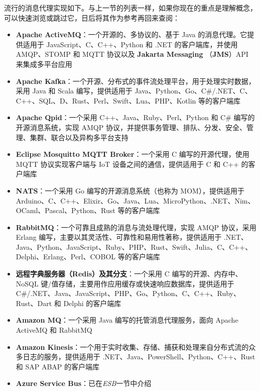 \label{idx:1352}
\label{idx:1353}
流行的消息代理实现如下。与上一节的列表一样，如果你现在的重点是理解概念，可以快速浏览或跳过它，日后将其作为参考再回来查阅：

\begin{itemize}
\label{idx:1354}
\label{idx:1355}
\item \textbf{Apache ActiveMQ}：一个开源的、多协议的、基于 Java 的消息代理。它提供适用于 JavaScript、C、C++、Python 和 .NET 的客户端库，并使用 AMQP、STOMP 和 MQTT 协议以及 \textbf{Jakarta Messaging }（\textbf{JMS}）API 来集成多平台应用
\label{idx:1356}
\item \textbf{Apache Kafka}：一个开源、分布式的事件流处理平台，用于处理实时数据，采用 Java 和 Scala 编写，提供适用于 Java、Python、Go、C\#/.NET、C、C++、SQL、D、Rust、Perl、Swift、Lua、PHP、Kotlin 等的客户端库
\label{idx:1357}
\item \textbf{Apache Qpid}：一个采用 C++、Java、Ruby、Perl、Python 和 C\# 编写的开源消息系统，实现 AMQP 协议，并提供事务管理、排队、分发、安全、管理、集群、联合以及异构多平台支持
\label{idx:1358}
\item \textbf{Eclipse Mosquitto MQTT Broker}：一个采用 C 编写的开源代理，使用 MQTT 协议实现客户端与 IoT 设备之间的通信，提供适用于 C 和 C++ 的客户端库
\label{idx:1359}
\item \textbf{NATS}：一个采用 Go 编写的开源消息系统（也称为 MOM），提供适用于 Arduino、C、C++、Elixir、Go、Java、Lua、MicroPython、.NET、Nim、OCaml、Pascal、Python、Rust 等的客户端库
\label{idx:1360}
\item \textbf{RabbitMQ}：一个可靠且成熟的消息与流处理代理，实现 AMQP 协议，采用 Erlang 编写，主要以其灵活性、可靠性和易用性著称，提供适用于 .NET、Java、Python、JavaScript、Ruby、PHP、Rust、Swift、Julia、C、C++、Delphi、Erlang、Perl、COBOL 等的客户端库
\label{idx:1361}
\item \textbf{远程字典服务器（Redis）及其分支}：一个采用 C 编写的开源、内存中、NoSQL 键/值存储，主要用作应用缓存或快速响应数据库，提供适用于 C\#/.NET、Java、JavaScript、PHP、Go、Python、C、C++、Ruby、Rust、Dart 和 Delphi 的客户端库
\label{idx:1362}
\item \textbf{Amazon MQ}：一个采用 Java 编写的托管消息代理服务，面向 Apache ActiveMQ 和 RabbitMQ
\label{idx:1363}
\item \textbf{Amazon Kinesis}：一个用于实时收集、存储、捕获和处理来自分布式流的众多日志的服务，提供适用于 .NET、Java、PowerShell、Python、C++、Rust 和 SAP ABAP 的客户端库
\label{idx:1364}
\item \textbf{Azure Service Bus}：已在\emph{ESB}一节中介绍

\end{itemize}
